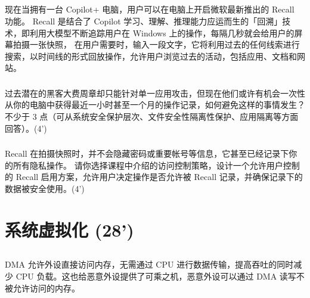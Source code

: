 \documentclass[a4paper,12pt]{article}
\newcommand{\score}[1]{(#1')}
\begin{document}
\subsection{}

现在当拥有一台 Copilot+ 电脑，用户可以在电脑上开启微软最新推出的 Recall 功能。
Recall 是结合了 Copilot 学习、理解、推理能力应运而生的「回溯」技术，即利用大模型不断追踪用户在 Windows 上的操作，每隔几秒就会给用户的屏幕拍摄一张快照，
在用户需要时，输入一段文字，它将利用过去的任何线索进行搜索，以时间线的形式回放操作，允许用户浏览过去的活动，包括应用、文档和网站。

\subsubsection{}

过去潜在的黑客大费周章却只能针对单一应用攻击，但现在他们或许有机会一次性从你的电脑中获得最近一小时甚至一个月的操作记录，如何避免这样的事情发生？
不少于 3 点（可从系统安全保护层次、文件安全性隔离性保护、应用隔离等方面回答）。\score{4}

\begin{answer}
  \lipsum[3]
\end{answer}

\subsubsection{}

Recall 在拍摄快照时，并不会隐藏密码或重要帐号等信息，它甚至已经记录下你的所有隐私操作。
请你选择课程中介绍的访问控制策略，设计一个允许用户控制的 Recall 启用方案，允许用户决定操作是否允许被 Recall 记录，并确保记录下的数据被安全使用。\score{4}

\begin{answer}
  \lipsum[3]
\end{answer}

\section{系统虚拟化 \score{28}}

\subsection{}

DMA 允许外设直接访问内存，无需通过 CPU 进行数据传输，提高吞吐的同时减少 CPU 负载。这也给恶意外设提供了可乘之机，恶意外设可以通过 DMA 读写不被允许访问的内存。

\subsubsection{}
\end{document}
